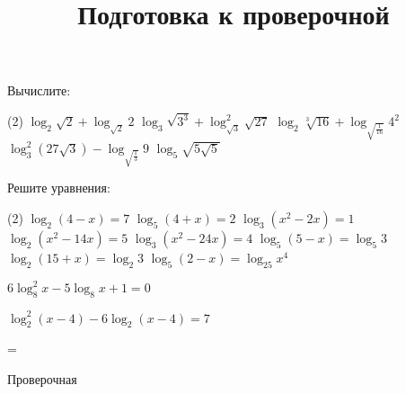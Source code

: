 \begin{class}[number=7]
	\title{Подготовка к проверочной}
	\begin{listofex}
		\item Вычислите:
		\begin{tasks}(2)
			\task \( \log_2 \sqrt{2} + \log_{\sqrt{2}}2 \)
			\task \( \log_3 \sqrt{3^3} + \log^2_{\sqrt{3}}\sqrt{27} \)
			\task \( \log_2 \sqrt[3]{16} + \log_{\sqrt{\frac{1}{16}}}4^{2} \)
			\task \( \log^2_3 (27\sqrt{3}) - \log_{\sqrt{\frac{1}{3}}}9 \)
			\task \( \log_5 \sqrt{5\sqrt{5}} \)
		\end{tasks}
		\item Решите уравнения: %
		\begin{tasks}(2)
			\task \( \log_2 (4-x)=7 \)
			\task \( \log_5(4+x)=2 \)
			\task \( \log_3 (x^2-2x)=1 \)
			\task \( \log_2 (x^2-14x)=5 \)
			\task \( \log_3 (x^2-24x)=4 \)
			\task \( \log_5(5-x)=\log_5 3 \)
			\task \( \log_2(15+x)=\log_2 3 \)
			\task \( \log_5 (2-x) = \log_{25} x^4 \)
			
			\task \( 6 \log^2_8 x -5\log_8 x+1=0 \)
			
			
			\task \( \log_2^2 (x-4) -6 \log_2 (x-4) = 7 \)
		\end{tasks}
		
		
	\end{listofex}
\end{class}

=%
\begin{exam}
	\begin{listofex}
		\item Проверочная
	\end{listofex}
\end{exam}
